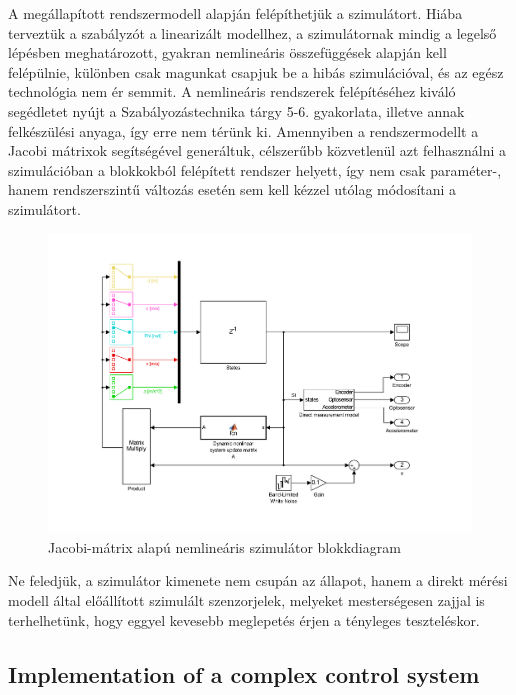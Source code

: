 A megállapított rendszermodell alapján felépíthetjük a szimulátort. Hiába terveztük a szabályzót a linearizált modellhez, a szimulátornak mindig a legelső lépésben meghatározott, gyakran nemlineáris összefüggések alapján kell felépülnie, különben csak magunkat csapjuk be a hibás szimulációval, és az egész technológia nem ér semmit.
A nemlineáris rendszerek felépítéséhez kiváló segédletet nyújt a Szabályozástechnika tárgy 5-6. gyakorlata, illetve annak felkészülési anyaga\cite[p.~319-354]{szabtech}, így erre nem térünk ki. Amennyiben a rendszermodellt a Jacobi mátrixok segítségével generáltuk, célszerűbb közvetlenül azt felhasználni a szimulációban a blokkokból felépített rendszer helyett, így nem csak paraméter-, hanem rendszerszintű változás esetén sem kell kézzel utólag módosítani a szimulátort.

\begin{figure}[!ht]
    \centering
    \includegraphics[width=\linewidth]{img/sys}
    \centering
    \vspace{-30pt}
    \caption{Jacobi-mátrix alapú nemlineáris szimulátor blokkdiagram}
    \label{fig:model}
\end{figure}

Ne feledjük, a szimulátor kimenete nem csupán az állapot, hanem a direkt mérési modell által előállított szimulált szenzorjelek, melyeket mesterségesen zajjal is terhelhetünk, hogy eggyel kevesebb meglepetés érjen a tényleges teszteléskor.

\subsection{Implementation of a complex control system}


